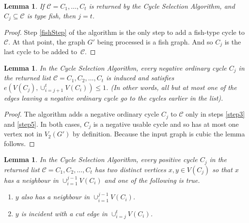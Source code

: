 \documentclass[12pt]{article}
\newtheorem{lemma}[theorem]{Lemma}
\begin{document}
\begin{lemma}\label{lem:cycSelFish}
    If $\mathcal{C} = C_1, \dots, C_t$ is returned by the Cycle Selection Algorithm, and $C_j\subseteq \mathcal{C}$ is type fish, then $j = t$.%
\end{lemma}
\begin{proof}
    Step \ref{fishStep} of the algorithm is the only step to add a fish-type cycle to $\mathcal{C}$. At that point, the graph $G'$ being processed is a fish graph. And so $C_j$ is the last cycle to be added to~$\mathcal{C}$.%
\end{proof}

\begin{lemma}\label{lem:ordinary}
    In the Cycle Selection Algorithm, every negative ordinary cycle $C_j$ in the returned list $\mathcal{C} = C_1, C_2, \dots, C_t$ is induced and satisfies $e(V(C_j), \cup_{i = j+1}^{t} V(C_i) ) \le 1$. (In other words, all but at most one of the edges leaving a negative ordinary cycle go to the cycles earlier in the list).
\end{lemma}
\begin{proof}
    The algorithm adds a negative ordinary cycle $C_j$ to $\mathcal{C}$ only in steps \ref{step3} and \ref{step5}. In both cases, $C_j$ is a negative usable cycle and so has at most one vertex not in $V_2(G')$ by definition. Because the input graph is cubic the lemma follows.
\end{proof}

\begin{lemma}\label{lem:positive}
    In the Cycle Selection Algorithm, every positive cycle $C_j$ in the returned list $\mathcal{C} = C_1, C_2, \dots, C_t$ has two distinct vertices $x,y \in V(C_j)$ so that $x$ has a neighbour in $\cup_{i = 1}^{j-1} V(C_i)$ and one of the following is true.
    \begin{enumerate}
        \item $y$ also has a neighbour in $\cup_{i = 1}^{j-1} V(C_i)$.
        \item $y$ is incident with a cut edge in $\cup_{i = j}^{t} V(C_i)$. %
    \end{enumerate}
\end{lemma}
\end{document}
